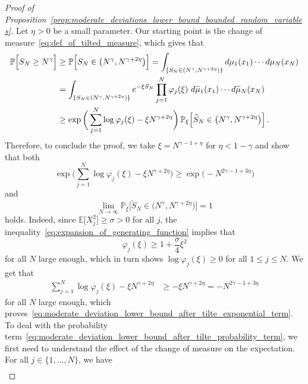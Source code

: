 \documentclass[11pt]{amsart}
\theoremstyle{definition}
\theoremstyle{remark}
\numberwithin{equation}{section}
\newcommand{\bP}{\mathbb P}
\newcommand{\bE}{\mathbb E}
\begin{document}
	\begin{proof}[Proof of Proposition~\ref{prop:moderate_deviations_lower_bound_bounded_random_variables}]
		Let $\eta>0$ be a small parameter. Our starting point is the change of measure~\eqref{eq:def_of_tilted_measure}, which gives that
		\begin{align*}
			\bP\Big[S_N \ge N^\gamma\Big] &\ge \bP\Big[S_N\in \big(N^\gamma, N^{\gamma+2\eta}\big)\Big] = \int_{\{S_N\in (N^\gamma, N^{\gamma+2\eta})\}} {\rm d} \mu_1(x_1) \cdots {\rm d}\mu_N(x_N) \\ &= \int_{\{S_N\in (N^\gamma, N^{\gamma+2\eta})\}} e^{-\xi S_N} \prod_{j=1}^{N} \varphi_j(\xi) \ {\rm d} \widetilde\mu_1(x_1) \cdots {\rm d}\widetilde{\mu}_N(x_N) \\ & \ge \exp\bigg(\sum_{j=1}^{N} \log \varphi_j(\xi) - \xi N^{\gamma+2\eta}\bigg) \,  \bP_\xi \Big[\widetilde{S}_N \in \big(N^\gamma, N^{\gamma+2\eta}\big)\Big] \, .
		\end{align*}
		Therefore, to conclude the proof, we take $\xi = N^{\gamma-1+\eta}$ for $\eta<1-\gamma$ and show that both
		\begin{equation}
			\label{eq:moderate_deviation_lower_bound_after_tilte_exponential_term}
			\exp\bigg(\sum_{j=1}^{N} \log \varphi_j(\xi) - \xi N^{\gamma+2\eta}\bigg) \ge \exp\Big(-N^{2\gamma-1 + 3\eta}\Big)
		\end{equation}
		and 
		\begin{equation}
			\label{eq:moderate_deviation_lower_bound_after_tilte_probability_term}
			\lim_{N\to \infty} \bP_\xi \Big[\widetilde{S}_N \in \big(N^\gamma, N^{\gamma+2\eta}\big)\Big] = 1 
		\end{equation}
		holds. Indeed, since $\bE\big[X_j^2\big]\ge \sigma >0$ for all $j$, the inequality~\eqref{eq:expansion_of_generating_function} implies that
		\[
		\varphi_j(\xi) \ge 1 + \frac{\sigma}{4} \xi^2
		\]
		for all $N$ large enough, which in turn shows $\log \varphi_j(\xi) \ge 0$
		for all $1\le j \le N$. We get that
		\begin{align*}
			\sum_{j=1}^{N} \log \varphi_j(\xi) - \xi N^{\gamma+2\eta} &\ge - \xi N^{\gamma+2\eta} = - N^{2\gamma -1 + 3\eta} 
		\end{align*}
		for all $N$ large enough, which proves~\eqref{eq:moderate_deviation_lower_bound_after_tilte_exponential_term}. To deal with the probability term~\eqref{eq:moderate_deviation_lower_bound_after_tilte_probability_term}, we first need to understand the effect of the change of measure on the expectation. For all $j\in \{1,\ldots,N\}$, we have
		\begin{align*}

\end{align*}
\end{proof}
\end{document}
